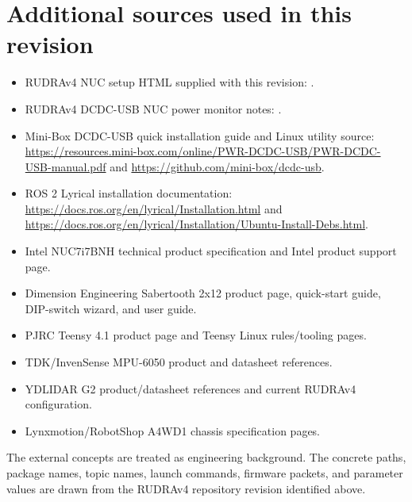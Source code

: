 \section*{Additional sources used in this revision}
\begin{itemize}
  \item RUDRAv4 NUC setup HTML supplied with this revision: .
  \item RUDRAv4 DCDC-USB NUC power monitor notes: .
  \item Mini-Box DCDC-USB quick installation guide and Linux utility source: \url{https://resources.mini-box.com/online/PWR-DCDC-USB/PWR-DCDC-USB-manual.pdf} and \url{https://github.com/mini-box/dcdc-usb}.
  \item ROS 2 Lyrical installation documentation: \url{https://docs.ros.org/en/lyrical/Installation.html} and \url{https://docs.ros.org/en/lyrical/Installation/Ubuntu-Install-Debs.html}.
  \item Intel NUC7i7BNH technical product specification and Intel product support page.
  \item Dimension Engineering Sabertooth 2x12 product page, quick-start guide, DIP-switch wizard, and user guide.
  \item PJRC Teensy 4.1 product page and Teensy Linux rules/tooling pages.
  \item TDK/InvenSense MPU-6050 product and datasheet references.
  \item YDLIDAR G2 product/datasheet references and current RUDRAv4  configuration.
  \item Lynxmotion/RobotShop A4WD1 chassis specification pages.
\end{itemize}

The external concepts are treated as engineering background. The concrete paths, package names, topic names, launch commands, firmware packets, and parameter values are drawn from the RUDRAv4 repository revision identified above.
